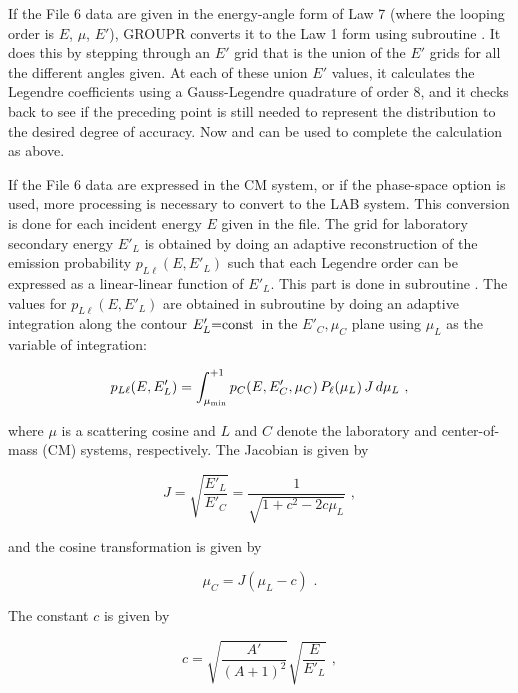 If the File 6 data are given in the energy-angle form of Law 7 (where
the looping order is $E$, $\mu$, $E'$), GROUPR converts it to the Law 1
form using subroutine .  It
does this by stepping through an $E'$ grid that is the union of
the $E'$ grids for all the different angles given.  At each of
these union $E'$ values, it calculates the Legendre coefficients
using a Gauss-Legendre quadrature of order 8, and it checks back
to see if the preceding point is still needed to represent the
distribution to the desired degree of accuracy.  Now
 and
 can be used to complete
the calculation as above.

If the File 6 data are expressed in the CM system, or if the phase-space
option is used, more processing is necessary to convert to the LAB system.
This conversion is done for each incident energy $E$ given in the file.
The grid for laboratory secondary energy $E'_L$ is obtained by doing an
adaptive reconstruction of the emission probability $p_{L\ell}(E,E'_L)$
such that each Legendre order can be expressed as a linear-linear function
of $E'_L$.  This part is done in subroutine .  The values for
$p_{L\ell}(E,E'_L)$ are obtained in subroutine  by doing
an adaptive integration along the contour $E'_L{=}\hbox{\rm const}\,$ in
the $E'_C,\mu_C$ plane using $\mu_L$ as the variable of integration:

\begin{equation}
   p_{L\ell}(E,E'_L) = \int_{\mu_{\rm min}}^{+1}
      p_C(E,E'_C,\mu_C)\,P_\ell(\mu_L)\,J\,d\mu_L\,\,,
\label{yy1}
\end{equation}

\noindent
where $\mu$ is a scattering cosine and $L$ and $C$ denote the laboratory
and center-of-mass (CM) systems, respectively.  The Jacobian is given by

\begin{equation}
   J=\sqrt{\frac{E'_L}{E'_C}}=\frac{1}{\sqrt{1+c^2-2c\mu_L}}\,\,,
\label{yy2}
\end{equation}

\noindent
and the cosine transformation is given by

\begin{equation}
   \mu_C=J(\mu_L-c)\,\,.
\label{yy3}
\end{equation}

\noindent
The constant $c$ is given by

\begin{equation}
   c=\sqrt{\frac{A'}{(A+1)^2}}\sqrt{\frac{E}{E'_L}}\,\,,
\label{yy4}
\end{equation}
\vspace{0.5 pt}

